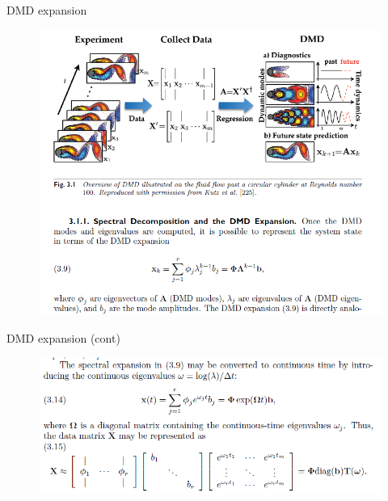 \documentclass{beamer}
\begin{document}
\begin{frame}{DMD expansion}
\begin{figure}[h]
	\centering
		\includegraphics[scale=0.5]{../Figures/fig_dmd_fig3.png}
\end{figure}	
\end{frame}

\begin{frame}{DMD expansion (cont)}
	\begin{figure}[h]
		\centering
			\includegraphics[scale=0.5]{../Figures/fig_dmd_fig4.png}
	\end{figure}	
\end{frame}
\end{document}
